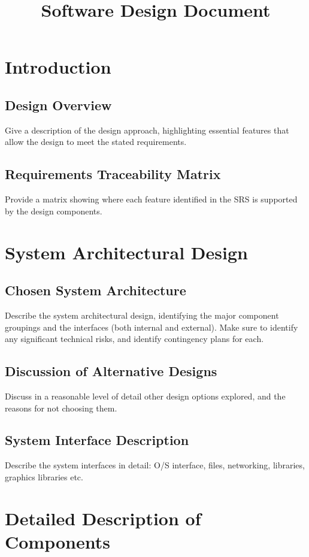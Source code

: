 \documentclass{article}
\title{Software Design Document}
\author{}
\date{}
\begin{document}
\maketitle

\section{Introduction}

\subsection{Design Overview}
Give a description of the design approach, highlighting essential features that allow the design to meet the stated requirements.

\subsection{Requirements Traceability Matrix}
Provide a matrix showing where each feature identified in the SRS is supported by the design components.

\section{System Architectural Design}

\subsection{Chosen System Architecture}
Describe the system architectural design, identifying the major component groupings and the interfaces (both internal and external). Make sure to identify any significant technical risks, and identify contingency plans for each.

\subsection{Discussion of Alternative Designs}
Discuss in a reasonable level of detail other design options explored, and the reasons for not choosing them.

\subsection{System Interface Description}
Describe the system interfaces in detail: O/S interface, files, networking, libraries, graphics libraries etc.

\section{Detailed Description of Components}
\end{document}
